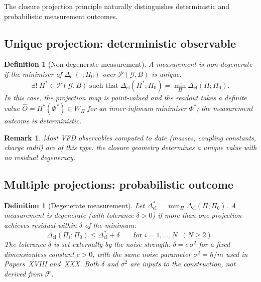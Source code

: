 \documentclass[12pt]{article}
\newtheorem{definition}[theorem]{Definition}
\newtheorem{remark}[theorem]{Remark}
\newcommand{\Fcal}{\mathcal{F}}
\newcommand{\Pcal}{\mathcal{P}}
\newcommand{\Gcal}{\mathcal{G}}
\newcommand{\Dcl}{\Delta_{\mathrm{cl}}}
\begin{document}
The closure projection principle naturally distinguishes deterministic and probabilistic measurement outcomes.

\subsection{Unique projection: deterministic observable}

\begin{definition}[Non-degenerate measurement]\label{def:unique}
A measurement is \textit{non-degenerate} if the minimiser of $\Dcl(\cdot;\Pi_0)$ over $\Pcal(\Gcal, B)$ is unique:
\begin{equation}
    \exists!\; \Pi^* \in \Pcal(\Gcal, B) \;\text{such that}\; \Dcl(\Pi^*;\Pi_0) = \min_\Pi \Dcl(\Pi;\Pi_0).
\end{equation}
In this case, the projection map is point-valued and the readout takes a definite value $\hat{O} = \Pi^*(\Phi^*) \in W_\Pi$ for an inner-infimum minimiser $\Phi^*$; the measurement outcome is deterministic.
\end{definition}

\begin{remark}
Most VFD observables computed to date (masses, coupling constants, charge radii) are of this type: the closure geometry determines a unique value with no residual degeneracy.
\end{remark}

\subsection{Multiple projections: probabilistic outcome}

\begin{definition}[Degenerate measurement]\label{def:degenerate}
Let $\Dcl^* = \min_\Pi \Dcl(\Pi;\Pi_0)$. A measurement is \textit{degenerate} (with tolerance $\delta > 0$) if more than one projection achieves residual within $\delta$ of the minimum:
\begin{equation}
    \Dcl(\Pi_i;\Pi_0) \leq \Dcl^* + \delta \qquad \text{for } i = 1, \ldots, N \;\;(N \geq 2).
\end{equation}
The tolerance $\delta$ is set externally by the noise strength: $\delta = c\,\sigma^2$ for a fixed dimensionless constant $c > 0$, with the same noise parameter $\sigma^2 = \hbar/m$ used in Papers~XVIII and~XXX. Both $\delta$ and $\sigma^2$ are inputs to the construction, not derived from $\Fcal$.
\end{definition}
\end{document}
